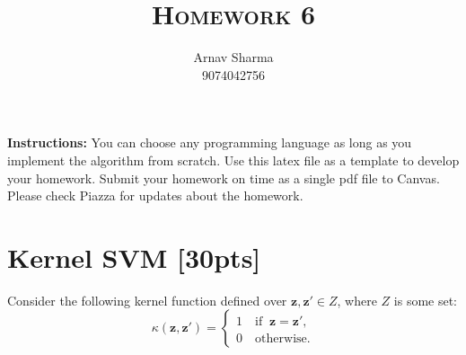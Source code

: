 \documentclass[a4paper]{article}
\title{\textsc{Homework 6}} %
\author{
Arnav Sharma\\
9074042756\\
}
\date{}
\theoremstyle{definition}
\begin{document}
\maketitle 


\textbf{Instructions:} 
You can choose any programming language as long as you implement the algorithm from scratch. Use this latex file as a template to develop your homework.
Submit your homework on time as a single pdf file to Canvas.
Please check Piazza for updates about the homework.\\


\section{Kernel SVM [30pts]}
Consider the following kernel function defined over $\mathbf z,\mathbf z'\in Z$, where $Z$ is some set:
\[
\kappa(\mathbf z,\mathbf z')=\begin{cases}
    1 \quad \mathrm{if }\;\; \mathbf z=\mathbf z',\\
0\quad \mathrm{otherwise}.
\end{cases}
\]
\end{document}
